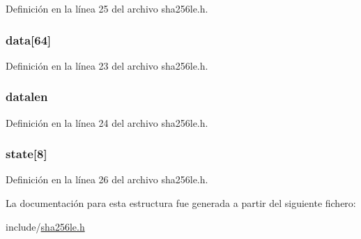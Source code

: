 Definición en la línea 25 del archivo sha256le.\+h.

\hypertarget{struct_s_h_a256___c_t_x_a8a17db6f40bbecb79cbb64aaeeaeba5e}{}
\subsubsection[{data}]{ data\mbox{[}64\mbox{]}}\label{struct_s_h_a256___c_t_x_a8a17db6f40bbecb79cbb64aaeeaeba5e}


Definición en la línea 23 del archivo sha256le.\+h.

\hypertarget{struct_s_h_a256___c_t_x_ab94b143853886bff721a273cc7242171}{}
\subsubsection[{datalen}]{ datalen}\label{struct_s_h_a256___c_t_x_ab94b143853886bff721a273cc7242171}


Definición en la línea 24 del archivo sha256le.\+h.

\hypertarget{struct_s_h_a256___c_t_x_a6cde2322d13788f1d9740d1cae5d58a0}{}
\subsubsection[{state}]{ state\mbox{[}8\mbox{]}}\label{struct_s_h_a256___c_t_x_a6cde2322d13788f1d9740d1cae5d58a0}


Definición en la línea 26 del archivo sha256le.\+h.



La documentación para esta estructura fue generada a partir del siguiente fichero\+:\begin{DoxyCompactItemize}
\item 
include/\hyperlink{sha256le_8h}{sha256le.\+h}\end{DoxyCompactItemize}
